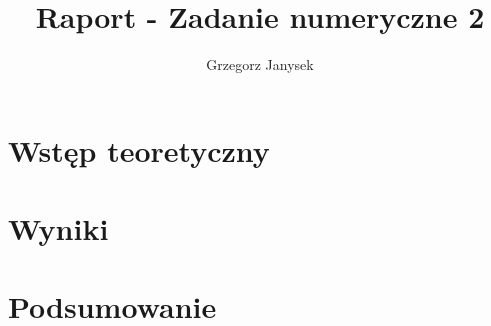 \documentclass{extarticle}
\author{Grzegorz Janysek}
\title{Raport - Zadanie numeryczne 2}
\begin{document}
	\maketitle
	\begin{multicols}{2}

		\section{Wstęp teoretyczny}
		\section{Wyniki}
		\section{Podsumowanie}

	\end{multicols}
\end{document}
